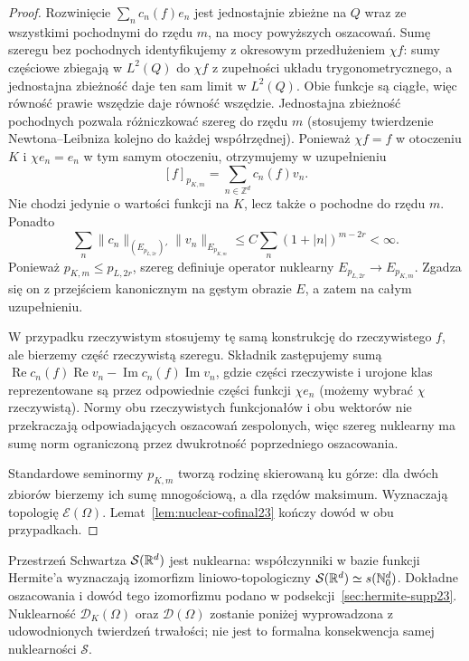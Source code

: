 \begin{proof}
Rozwinięcie $\sum_n c_n(f)e_n$ jest jednostajnie
zbieżne na $Q$ wraz ze wszystkimi pochodnymi do rzędu
$m$, na mocy powyższych oszacowań.
Sumę szeregu bez pochodnych identyfikujemy z okresowym
przedłużeniem $\chi f$: sumy częściowe zbiegają
w $L^2(Q)$ do $\chi f$ z zupełności układu
trygonometrycznego, a jednostajna zbieżność daje
ten sam limit w $L^2(Q)$. Obie funkcje są ciągłe,
więc równość prawie wszędzie daje równość wszędzie.
Jednostajna zbieżność pochodnych pozwala różniczkować
szereg do rzędu $m$ (stosujemy twierdzenie
Newtona--Leibniza kolejno do każdej współrzędnej).
Ponieważ $\chi f=f$ w otoczeniu $K$ i $\chi e_n=e_n$
w tym samym otoczeniu, otrzymujemy w uzupełnieniu
\[
 [f]_{p_{K,m}}=\sum_{n\in\mathbb Z^d}c_n(f)v_n.
\]
Nie chodzi jedynie o wartości funkcji na $K$,
lecz także o pochodne do rzędu $m$.
Ponadto
\[
 \sum_n\|c_n\|_{(E_{p_{L,2r}})'}\|v_n\|_{E_{p_{K,m}}}
 \le C\sum_n(1+|n|)^{m-2r}<\infty.
\]
Ponieważ $p_{K,m}\le p_{L,2r}$, szereg definiuje
operator nuklearny $E_{p_{L,2r}}\to E_{p_{K,m}}$.
Zgadza się on z przejściem kanonicznym na gęstym
obrazie $E$, a zatem na całym uzupełnieniu.

W przypadku rzeczywistym stosujemy tę samą konstrukcję
do rzeczywistego $f$, ale bierzemy część rzeczywistą
szeregu. Składnik zastępujemy sumą
$\operatorname{Re}c_n(f)\operatorname{Re}v_n-
\operatorname{Im}c_n(f)\operatorname{Im}v_n$,
gdzie części rzeczywiste i urojone klas reprezentowane
są przez odpowiednie części funkcji $\chi e_n$
(możemy wybrać $\chi$ rzeczywistą).
Normy obu rzeczywistych funkcjonałów i obu wektorów
nie przekraczają odpowiadających oszacowań zespolonych,
więc szereg nuklearny ma sumę norm ograniczoną przez
dwukrotność poprzedniego oszacowania.

Standardowe seminormy $p_{K,m}$ tworzą rodzinę
skierowaną ku górze: dla dwóch zbiorów bierzemy
ich sumę mnogościową, a dla rzędów maksimum.
Wyznaczają topologię $\mathcal E(\Omega)$.
Lemat~\ref{lem:nuclear-cofinal23} kończy dowód
w obu przypadkach.
\end{proof}

\begin{uwaga}
\label{rem:hermite-nuclear23}
Przestrzeń Schwartza $\mathcal S(\mathbb R^d)$ jest nuklearna:
współczynniki w bazie funkcji Hermite'a wyznaczają
izomorfizm liniowo-topologiczny
$\mathcal S(\mathbb R^d)\simeq s(\mathbb N_0^d)$.
Dokładne oszacowania i dowód tego izomorfizmu podano
w podsekcji~\ref{sec:hermite-supp23}.
Nuklearność $\mathcal D_K(\Omega)$ oraz
$\mathcal D(\Omega)$ zostanie poniżej wyprowadzona
z udowodnionych twierdzeń trwałości; nie jest to
formalna konsekwencja samej nuklearności $\mathcal S$.
\end{uwaga}

